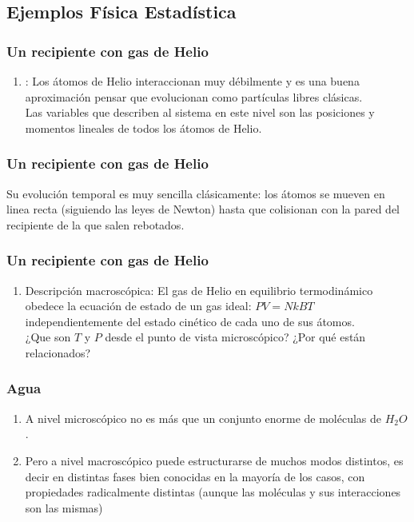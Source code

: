 \documentclass[12pt]{beamer}
\begin{document}
\subsection{Ejemplos Física Estadística}

\begin{frame}
\frametitle{Un recipiente con gas de Helio}
\begin{enumerate}[<+->]
\item {}: \pause Los átomos de Helio interaccionan muy débilmente y es una buena aproximación pensar que evolucionan como partículas libres clásicas.
\\
\bigskip
\pause
Las variables que describen al sistema en este nivel son las posiciones y momentos lineales de todos los átomos de Helio.
\seti
\end{enumerate}
\end{frame}
\begin{frame}
\frametitle{Un recipiente con gas de Helio}    
Su evolución temporal es muy sencilla clásicamente: \pause los átomos se mueven en linea recta (siguiendo las leyes de Newton) hasta que colisionan con la pared del recipiente de la que salen rebotados.
\end{frame}
\begin{frame}
\frametitle{Un recipiente con gas de Helio}
\begin{enumerate}[<+->]
\conti
\item Descripción macroscópica: \pause El gas de Helio en equilibrio termodinámico obedece la ecuación de estado de un gas ideal: \pause $P V = N k B T$ independientemente del estado cinético de cada uno de sus átomos.
\\
\bigskip
\pause
¿Que son $T$ y $P$ desde el punto de vista microscópico? \pause ¿Por qué están relacionados?
\end{enumerate}
\end{frame}
\begin{frame}
\frametitle{Agua}
\begin{enumerate}[<+->]
\item A nivel microscópico no es más que un conjunto enorme de moléculas de $H_{2} O$.
\item Pero a nivel macroscópico puede estructurarse de muchos modos distintos, \pause es decir en distintas fases bien conocidas en la mayoría de los casos, con propiedades radicalmente distintas (aunque las moléculas y sus interacciones son las mismas)
\end{enumerate}
\end{frame}
\end{document}
